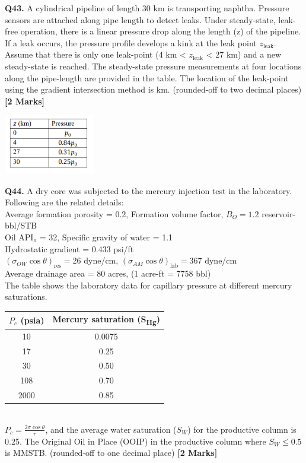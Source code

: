 \documentclass[11pt]{article}
\newcommand{\questionb}[2]{
    \noindent\textbf{Q#2.} #1 \hfill \textbf{[2 Marks]}
}
\begin{document}
\questionb{A cylindrical pipeline of length 30 km is transporting naphtha. Pressure sensors are attached along pipe length to detect leaks. Under steady-state, leak-free operation, there is a linear pressure drop along the length (z) of the pipeline. If a leak occurs, the pressure profile develops a kink at the leak point \( z_{\text{leak}} \). \\
Assume that there is only one leak-point (4 km < \( z_{\text{leak}} \) < 27 km) and a new steady-state is reached. The steady-state pressure measurements at four locations along the pipe-length are provided in the table. The location of the leak-point using the gradient intersection method is \underline{\hspace{3cm}} km. (rounded-off to two decimal places)}{43}
\begin{center}
\includegraphics[width=0.3\textwidth]{figures/43.png}
\end{center}
\vspace{0.5cm}

\questionb{A dry core was subjected to the mercury injection test in the laboratory. Following are the related details: \\
Average formation porosity = 0.2, Formation volume factor, \( B_O = 1.2 \) reservoir-bbl/STB \\
Oil API\(_o\) = 32, Specific gravity of water = 1.1 \\
Hydrostatic gradient = 0.433 psi/ft \\
\( (\sigma_{OW} \cos \theta)_{\text{res}} = 26 \) dyne/cm, \( (\sigma_{AM} \cos \theta)_{\text{lab}} = 367 \) dyne/cm \\
Average drainage area = 80 acres, (1 acre-ft = 7758 bbl) \\
The table shows the laboratory data for capillary pressure at different mercury saturations. \\
\begin{tabular}{|c|c|}
\hline
\( P_c \) (psia) & Mercury saturation (S\textsubscript{Hg}) \\
\hline
10 & 0.0075 \\
17 & 0.25 \\
30 & 0.50 \\
108 & 0.70 \\
2000 & 0.85 \\
\hline
\end{tabular} \\
\( P_c = \frac{2\sigma \cos \theta}{r} \), and the average water saturation (\( S_W \)) for the productive column is 0.25. The Original Oil in Place (OOIP) in the productive column where \( S_W \leq 0.5 \) is \underline{\hspace{3cm}} MMSTB. (rounded-off to one decimal place)}{44}
\vspace{0.5cm}
\end{document}
